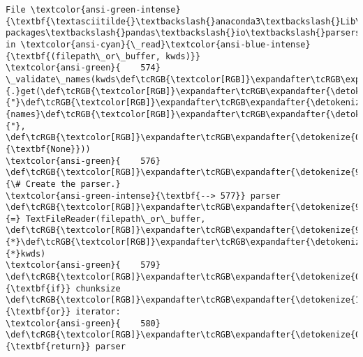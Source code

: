 \documentclass[11pt]{article}
\begin{document}
\begin{Verbatim}[commandchars=\\\{\}, frame=single, framerule=2mm, rulecolor=\color{outerrorbackground}]
File \textcolor{ansi-green-intense}{\textbf{\textasciitilde{}\textbackslash{}anaconda3\textbackslash{}Lib\textbackslash{}site-packages\textbackslash{}pandas\textbackslash{}io\textbackslash{}parsers\textbackslash{}readers.py:577}}, in \textcolor{ansi-cyan}{\_read}\textcolor{ansi-blue-intense}{\textbf{(filepath\_or\_buffer, kwds)}}
\textcolor{ansi-green}{    574} \_validate\_names(kwds\def\tcRGB{\textcolor[RGB]}\expandafter\tcRGB\expandafter{\detokenize{98,98,98}}{.}get(\def\tcRGB{\textcolor[RGB]}\expandafter\tcRGB\expandafter{\detokenize{175,0,0}}{"}\def\tcRGB{\textcolor[RGB]}\expandafter\tcRGB\expandafter{\detokenize{175,0,0}}{names}\def\tcRGB{\textcolor[RGB]}\expandafter\tcRGB\expandafter{\detokenize{175,0,0}}{"}, \def\tcRGB{\textcolor[RGB]}\expandafter\tcRGB\expandafter{\detokenize{0,135,0}}{\textbf{None}}))
\textcolor{ansi-green}{    576} \def\tcRGB{\textcolor[RGB]}\expandafter\tcRGB\expandafter{\detokenize{95,135,135}}{\# Create the parser.}
\textcolor{ansi-green-intense}{\textbf{--> 577}} parser \def\tcRGB{\textcolor[RGB]}\expandafter\tcRGB\expandafter{\detokenize{98,98,98}}{=} TextFileReader(filepath\_or\_buffer, \def\tcRGB{\textcolor[RGB]}\expandafter\tcRGB\expandafter{\detokenize{98,98,98}}{*}\def\tcRGB{\textcolor[RGB]}\expandafter\tcRGB\expandafter{\detokenize{98,98,98}}{*}kwds)
\textcolor{ansi-green}{    579} \def\tcRGB{\textcolor[RGB]}\expandafter\tcRGB\expandafter{\detokenize{0,135,0}}{\textbf{if}} chunksize \def\tcRGB{\textcolor[RGB]}\expandafter\tcRGB\expandafter{\detokenize{175,0,255}}{\textbf{or}} iterator:
\textcolor{ansi-green}{    580}     \def\tcRGB{\textcolor[RGB]}\expandafter\tcRGB\expandafter{\detokenize{0,135,0}}{\textbf{return}} parser


\end{Verbatim}
\end{document}
